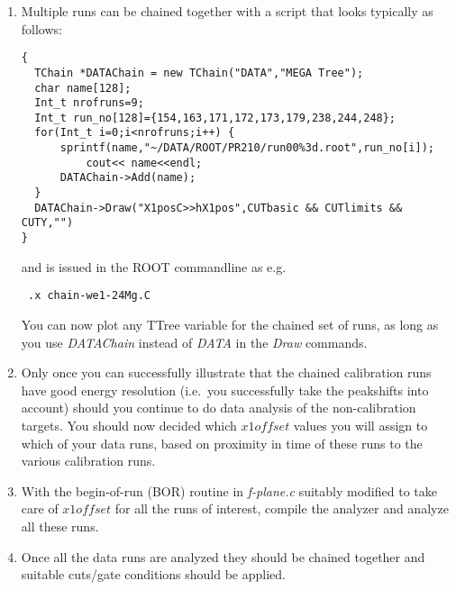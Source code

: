 \documentclass[11pt]{report}
\begin{document}
\begin{enumerate}
\item
Multiple runs can be chained together with a script that looks typically as follows:
\begin{verbatim} 
{
  TChain *DATAChain = new TChain("DATA","MEGA Tree");
  char name[128];
  Int_t nrofruns=9;
  Int_t run_no[128]={154,163,171,172,173,179,238,244,248};
  for(Int_t i=0;i<nrofruns;i++)	{
	  sprintf(name,"~/DATA/ROOT/PR210/run00%3d.root",run_no[i]);
          cout<< name<<endl;
	  DATAChain->Add(name);
  }
  DATAChain->Draw("X1posC>>hX1pos",CUTbasic && CUTlimits && CUTY,"")
} 
\end{verbatim}
and is issued in the ROOT commandline as e.g.
\begin{verbatim} .x chain-we1-24Mg.C \end{verbatim}

You can now plot any TTree variable for the chained set of runs, as long as you use
{\it DATAChain} instead of {\it DATA} in the {\it Draw} commands.

\item Only once you can successfully illustrate that the chained calibration runs
have good energy resolution (i.e.~you successfully take the peakshifts into account)
should you continue to do data analysis of the non-calibration targets.
You should now decided which $x1offset$ values you will assign to which
of your data runs, based on proximity in time of these runs to the various
calibration runs.

\item With the begin-of-run (BOR) routine in {\it f-plane.c} suitably modified to take care 
of $x1offset$ for all the runs of interest, compile the analyzer and analyze all these runs.

\item Once all the data runs are analyzed they should be chained together and suitable
cuts/gate conditions should be applied.


\end{enumerate}
\end{document}
